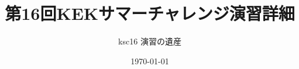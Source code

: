 \documentclass[dvipdfmx]{jsarticle}
\begin{document}
\title{第16回KEKサマーチャレンジ演習詳細}
\author{ksc16 演習の遺産}
\date{\today}
\begin{titlepage}
    \maketitle
    \thispagestyle{empty}
\end{titlepage}



\pagebreak



\end{document}
